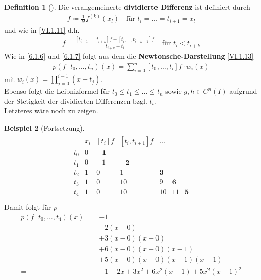 \documentclass[ngerman,fontsize=11pt, paper=a4, parskip=half, titlepage=true, toc=bib]{scrbook}
\theoremstyle{definition}
\newtheorem{Def}{Definition}[section]		%
\newtheorem{Bsp}[Def]{Beispiel}
\theoremstyle{plain}
\newenvironment{Bspe}[1][]{ %
  \begin{Bsp}[#1]}
  {\end{Bsp}
  	\addtocounter{subsection}{1}}
\newenvironment{Defe}[1][]{ %
  \begin{Def}[#1]}
  {\end{Def}
  	\addtocounter{subsection}{1}}
\begin{document}
\begin{Defe}
  Die verallgemeinerte \textbf{dividierte Differenz}
ist definiert durch 
\begin{gather*}
  [t_i,\dots, t_{i+1}]f \coloneqq \frac{1}{k!} f^{(k)}(x_l)
\quad \text{für } t_i=\dots = t_{i+1}=x_l
\end{gather*}
und wie in \eqref{VI.1.11} d.h.
\begin{gather*}
  [t_i,\dots, t_{i+k}]f = \frac{[t_{i+1},\dots, t_{i+k}]f
                                - [t_i,\dots,t_{i+k-1}]f}
                              {t_{i+k}-t_i}
\quad \text{für } t_i<t_{i+k}
\end{gather*}
Wie in \ref{6.1.6} und \ref{6.1.7} folgt aus dem 
die \textbf{Newtonsche-Darstellung} \eqref{VI.1.13}
\begin{gather*}
  p(f\,|\, t_0,\dots, t_{n})(x) = \sum_{i=0}^{n}[t_0,\dots,t_i]f\cdot w_i(x) 
\end{gather*}
mit $w_i(x) =\prod_{j=0}^{i-1}(x-t_j)$.\\
Ebenso folgt die Leibnizformel für $t_0\leq t_1\leq\dots\leq t_n$
sowie $g,h\in C^n(I)$ aufgrund der Stetigkeit
 der dividierten Differenzen bzgl. $t_i$.\\
Letzteres wäre noch zu zeigen.
\end{Defe}


\begin{Bspe}[Fortsetzung]
  \begin{align*}
    \begin{array}{ccccccc}
      &   x_i& [t_i]f & [t_i,t_{i+1}]f &\dots \\
      t_0 &0 & \boldsymbol{-1} \\
      t_1 &0 & -1 & \boldsymbol{-2}\\ 
      t_2 &1 & 0  & 1  &\boldsymbol{3} \\
      t_3 &1 & 0  & 10 &9  &\boldsymbol{6} \\
      t_4 &1 & 0  & 10 &10 &11 & \boldsymbol{5}
    \end{array}\\
  \end{align*}
  Damit folgt für $p$
  \begin{align*}
    p(f\,|\,t_0,\dots, t_4)(x) 
    =& -1\\
	  &-2(x-0)\\
     & +3(x-0)(x-0)\\
     & +6(x-0)(x-0)(x-1)\\
     & +5(x-0)(x-0)(x-1)(x-1)\\
    =&-1-2x+3x^2+6x^2(x-1)+5x^2(x-1)^2
  \end{align*}
\end{Bspe}
\end{document}
